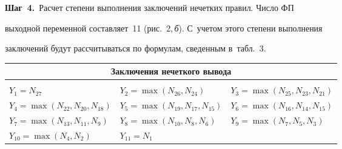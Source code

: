   


  \textbf{Шаг~4.}\ Расчет степени выполнения заключений нечетких правил. Число ФП 


выходной переменной составляет~11 (рис.~2,\,\textit{б}). С~учетом этого степени выполнения 


заключений будут рассчитываться по формулам, сведенным в~табл.~3.


  


\begin{table}\small %


\begin{center}




\vspace*{2ex}





\begin{tabular}{|l|l|l|}


\hline


\multicolumn{3}{|c|}{Заключения нечеткого вывода}\\


\hline


&&\\[-9pt]


$Y_1 = N_{27}$&


$Y_2 = \max(N_{26}, N_{24})$&


$Y_3 = \max(N_{25}, N_{23}, N_{21})$\\


$Y_4 = \max(N_{22}, N_{20}, N_{18})$&


$Y_5 = \max(N_{19}, N_{17}, N_{15})$&


$Y_6 = \max(N_{16}, N_{14}, N_{15})$\\


$Y_7 = \max(N_{13}, N_{11}, N_9)$ &


$Y_8 = \max(N_{10}, N_8, N_6)$&


$Y_9 = \max(N_7, N_5, N_3)$\\


$Y_{10} = \max(N_4,  N_2)$&


$Y_{11}= N_1$ &\\


\hline


\end{tabular}


\end{center}


\end{table}


